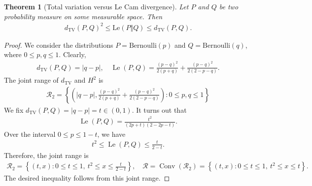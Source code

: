 \documentclass{article}
\numberwithin{equation}{section}
\renewcommand{\cal}{\mathcal}
\DeclareMathOperator{\Le}{Le}
\DeclareMathOperator{\conv}{Conv}
\theoremstyle{plain}
\newtheorem{theorem}{Theorem}[section]
\theoremstyle{definition}
\begin{document}
\begin{theorem}[Total variation versus Le Cam divergence]
	Let $P$ and $Q$ be two probability measure on some measurable space. Then
	\begin{align*}
		d_\mathrm{TV}(P,Q)^2\leq\mathrm{Le}(P\Vert Q)\leq d_\mathrm{TV}(P,Q).
	\end{align*}
\end{theorem}
\begin{proof}
	We consider the distributions $P=\mathrm{Bernoulli}(p)$ and $Q=\mathrm{Bernoulli}(q)$, where $0\leq p,q\leq 1$. Clearly,
	\begin{align*}
		d_\mathrm{TV}(P,Q)=\vert q-p\vert,\quad \Le(P,Q)=\frac{(p-q)^2}{2(p+q)}+\frac{(p-q)^2}{2(2-p-q)}.
	\end{align*} 
	The joint range of $d_{\mathrm{TV}}$ and $H^2$ is
	\begin{align*}
		\cal{R}_2=\left\{\left(\vert q-p\vert,\frac{(p-q)^2}{2(p+q)}+\frac{(p-q)^2}{2(2-p-q)}\right):0\leq p,q\leq 1\right\}
	\end{align*}
	We fix $d_\mathrm{TV}(P,Q)=\vert q-p\vert =t\in(0,1)$. It turns out that
	\begin{align*}
		\Le(P, Q)=\frac{t^2}{(2p+t)(2-2p-t)}.
	\end{align*}
	Over the interval $0\leq p\leq 1-t$, we have
	\begin{align*}
		t^2\leq\Le(P, Q)\leq\frac{t}{2-t}.
	\end{align*}
	Therefore, the joint range is
	\begin{align*}
		\cal{R}_2=\left\{(t,x):0\leq t\leq 1,\ t^2\leq x\leq\frac{t}{2-t}\right\},\quad\cal{R}=\conv(\cal{R}_2)=\left\{(t,x):0\leq t\leq 1,\ t^2\leq x\leq t\right\}.
	\end{align*}
	The desired inequality follows from this joint range.
\end{proof}
\end{document}
